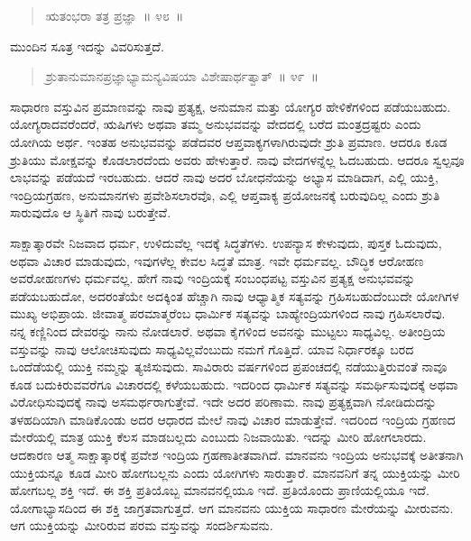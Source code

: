\vspace{-0.3cm}

\begin{verse}
ಋತಂಭರಾ ತತ್ರ ಪ್ರಜ್ಞಾ~॥ ೪೮~॥
\end{verse}

\vspace{-0.3cm}


ಮುಂದಿನ ಸೂತ್ರ ಇದನ್ನು ವಿವರಿಸುತ್ತದೆ. 

\vspace{-0.3cm}

\begin{verse}
ಶ್ರುತಾನುಮಾನಪ್ರಜ್ಞಾಭ್ಯಾಮನ್ಯವಿಷಯಾ ವಿಶೇಷಾರ್ಥತ್ವಾತ್​~॥ ೪೯~॥
\end{verse}

\vspace{-0.3cm}


ಸಾಧಾರಣ ವಸ್ತುವಿನ ಪ್ರಮಾಣವನ್ನು ನಾವು ಪ್ರತ್ಯಕ್ಷ, ಅನುಮಾನ ಮತ್ತು ಯೋಗ್ಯರ ಹೇಳಿಕೆಗಳಿಂದ ಪಡೆಯಬಹುದು. ಯೋಗ್ಯರಾದವರೆಂದರೆ, ಋಷಿಗಳು ಅಥವಾ ತಮ್ಮ ಅನುಭವವನ್ನು ವೇದದಲ್ಲಿ ಬರೆದ ಮಂತ್ರದ್ರಷ್ಟರು ಎಂದು ಯೋಗಿಯ ಅರ್ಥ. ಇಂತಹ ಅನುಭವವನ್ನು ಪಡೆದವರ ಆಪ್ತವಾಕ್ಯಗಳಾಗಿರುವುದೇ ಶ್ರುತಿ ಪ್ರಮಾಣ. ಆದರೂ ಕೂಡ ಶ್ರುತಿಯು ಮೋಕ್ಷವನ್ನು ಕೊಡಲಾರದೆಂದು ಅವರು ಹೇಳುತ್ತಾರೆ. ನಾವು ವೇದಗಳನ್ನೆಲ್ಲ ಓದಬಹುದು. ಆದರೂ ಸ್ವಲ್ಪವೂ ಲಾಭವನ್ನು ಪಡೆಯದೆ ಇರಬಹುದು. ಆದರೆ ನಾವು ಅದರ ಬೋಧನೆಯನ್ನು ಅಭ್ಯಾಸ ಮಾಡಿದಾಗ, ಎಲ್ಲಿ ಯುಕ್ತಿ, ಇಂದ್ರಿಯಗ್ರಹಣ, ಅನುಮಾನಗಳು ಪ್ರವೇಶಿಸಲಾರವೊ, ಎಲ್ಲಿ ಆಪ್ತವಾಕ್ಯ ಪ್ರಯೋಜನಕ್ಕೆ ಬರುವುದಿಲ್ಲ ಎಂದು ಶ್ರುತಿ ಸಾರುವುದೊ ಆ ಸ್ಥಿತಿಗೆ ನಾವು ಬರುತ್ತೇವೆ. 

ಸಾಕ್ಷಾತ್ಕಾರವೇ ನಿಜವಾದ ಧರ್ಮ, ಉಳಿದುವೆಲ್ಲ ಇದಕ್ಕೆ ಸಿದ್ಧತೆಗಳು. ಉಪನ್ಯಾಸ ಕೇಳುವುದು, ಪುಸ್ತಕ ಓದುವುದು, ಅಥವಾ ವಿಚಾರ ಮಾಡುವುದು, ಇವುಗಳೆಲ್ಲ ಕೇವಲ ಸಿದ್ಧತೆ ಮಾತ್ರ. ಇವೇ ಧರ್ಮವಲ್ಲ. ಬೌದ್ಧಿಕ ಆರೋಹಣ ಅವರೋಹಣಗಳು ಧರ್ಮವಲ್ಲ. ಹೇಗೆ ನಾವು ಇಂದ್ರಿಯಕ್ಕೆ ಸಂಬಂಧಪಟ್ಟ ವಸ್ತುವಿನ ಪ್ರತ್ಯಕ್ಷ ಅನುಭವವನ್ನು ಪಡೆಯಬಹುದೋ, ಅದರಂತೆಯೇ ಅದಕ್ಕಿಂತ ಹೆಚ್ಚಾಗಿ ನಾವು ಆಧ್ಯಾತ್ಮಿಕ ಸತ್ಯವನ್ನು ಗ್ರಹಿಸಬಹುದೆಂಬುದೇ ಯೋಗಿಗಳ ಮುಖ್ಯ ಅಭಿಪ್ರಾಯ. ಜೀವಾತ್ಮ ಪರಮಾತ್ಮರೆಂಬ ಧಾರ್ಮಿಕ ಸತ್ಯವನ್ನು ಬಾಹ್ಯೇಂದ್ರಿಯಗಳಿಂದ ನಾವು ಗ್ರಹಿಸಲಾರೆವು. ನನ್ನ ಕಣ್ಣಿನಿಂದ ದೇವರನ್ನು ನಾನು ನೋಡಲಾರೆ. ಅಥವಾ ಕೈಗಳಿಂದ ಅವನನ್ನು ಮುಟ್ಟಲು ಸಾಧ್ಯವಿಲ್ಲ. ಅತೀಂದ್ರಿಯ ವಸ್ತುವನ್ನು ನಾವು ಆಲೋಚಿಸುವುದು ಸಾಧ್ಯವಿಲ್ಲವೆಂಬುದು ನಮಗೆ ಗೊತ್ತಿದೆ. ಯಾವ ನಿರ್ಧಾರಕ್ಕೂ ಬರದ ಒಂದೆಡೆಯಲ್ಲಿ ಯುಕ್ತಿ ನಮ್ಮನ್ನು ತ್ಯಜಿಸುವುದು. ಸಾವಿರಾರು ವರ್ಷಗಳಿಂದ ಪ್ರಪಂಚದಲ್ಲಿ ನಡೆಯುತ್ತಿರುವಂತೆ ನಾವೂ ಕೂಡ ಬದುಕಿರುವವರೆಗೂ ವಿಚಾರದಲ್ಲಿ ಕಳೆಯಬಹುದು. ಇದರಿಂದ ಧಾರ್ಮಿಕ ಸತ್ಯವನ್ನು ಸಮರ್ಥಿಸುವುದಕ್ಕೆ ಅಥವಾ ವಿರೋಧಿಸುವುದಕ್ಕೆ ನಾವು ಅಸಮರ್ಥರಾಗುತ್ತೇವೆ. ಇದೇ ಅದರ ಪರಿಣಾಮ. ನಾವು ಪ್ರತ್ಯಕ್ಷವಾಗಿ ನೋಡಿದುದನ್ನು ತಳಹದಿಯಾಗಿ ಮಾಡಿಕೊಂಡು ಅದರ ಆಧಾರದ ಮೇಲೆ ನಾವು ವಿಚಾರ ಮಾಡುತ್ತೇವೆ. ಇದರಿಂದ ಇಂದ್ರಿಯ ಗ್ರಹಣದ ಮೇರೆಯಲ್ಲಿ ಮಾತ್ರ ಯುಕ್ತಿ ಕೆಲಸ ಮಾಡಬಲ್ಲದು ಎಂಬುದು ನಿಜವಾಯಿತು. ಇದನ್ನು ಮೀರಿ ಹೋಗಲಾರದು. ಆದಕಾರಣ ಆತ್ಮ ಸಾಕ್ಷಾತ್ಕಾರಕ್ಕೆ ಪ್ರವೇಶ ಇಂದ್ರಿಯ ಗ್ರಹಣಾತೀತವಾಗಿದೆ. ಮಾನವನು ಇಂದ್ರಿಯ ಅನುಭವಕ್ಕೆ ಅತೀತನಾಗಿ ಯುಕ್ತಿಯನ್ನೂ ಕೂಡ ಮೀರಿ ಹೋಗಬಲ್ಲನು ಎಂದು ಯೋಗಿಗಳು ಸಾರುತ್ತಾರೆ. ಮಾನವನಿಗೆ ತನ್ನ ಯುಕ್ತಿಯನ್ನು ಮೀರಿ ಹೋಗಬಲ್ಲ ಶಕ್ತಿ ಇದೆ. ಈ ಶಕ್ತಿ ಪ್ರತಿಯೊಬ್ಬ ಮಾನವನಲ್ಲಿಯೂ ಇದೆ. ಪ್ರತಿಯೊಂದು ಪ್ರಾಣಿಯಲ್ಲಿಯೂ ಇದೆ. ಯೋಗಾಭ್ಯಾಸದಿಂದ ಈ ಶಕ್ತಿ ಜಾಗ್ರತವಾಗುತ್ತದೆ. ಆಗ ಮಾನವನು ಯುಕ್ತಿಯ ಸಾಧಾರಣ ಮೇರೆಯನ್ನು ಮೀರುವನು. ಆಗ ಯುಕ್ತಿಯನ್ನು ಮೀರಿರುವ ಪರಮ ವಸ್ತುವನ್ನು ಸಂದರ್ಶಿಸುವನು. 

